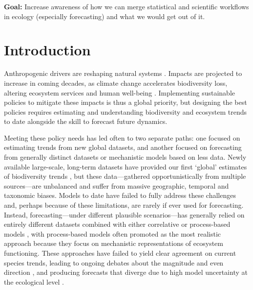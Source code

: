 \documentclass[11pt]{article}
\begin{document}
{\noindent \bf Goal:} Increase awareness of how we can merge statistical and scientific workflows in ecology (especially forecasting) and what we would get out of it.
\vspace*{0.5cm}

\section{Introduction}

Anthropogenic drivers are reshaping natural systems \citep{Diaz2019}. Impacts are projected to increase in coming decades, as climate change accelerates biodiversity loss, altering ecosystem services and human well-being \citep{IPBES2019}.
Implementing sustainable policies to mitigate these impacts is thus a global priority, but designing the best policies requires estimating and understanding biodiversity and ecosystem trends to date alongside the skill to forecast future dynamics. %

Meeting these policy needs has led often to two separate paths: one focused on estimating trends from new global datasets, and another focused on forecasting from generally distinct datasets or mechanistic models based on less data. Newly available large-scale, long-term datasets have provided our first `global' estimates of biodiversity trends \citep[e.g.][]{loh2005living,Dornelas2018}, but these data---gathered opportunistically from multiple sources---are unbalanced and suffer from massive geographic, temporal and taxonomic biases. Models to date have failed to fully address these challenges and, perhaps because of these limitations, are rarely if ever used for forecasting.
Instead, forecasting---under different plausible scenarios---has generally relied on entirely different datasets combined with either correlative or process-based models \citep{IPBES2019}, with process-based models often promoted as the most realistic approach \citep{Urban2016, Pilowsky2022} because they focus on mechanistic representations of ecosystem functioning. These approaches have failed to yield clear agreement on current species trends, leading to ongoing debates about the magnitude and even direction \citep{Dornelas2014, Leung2020, Buschke2021, Johnson2024}, and producing forecasts that diverge due to high model uncertainty at the ecological level \citep{Cheaib2012}.
\end{document}
